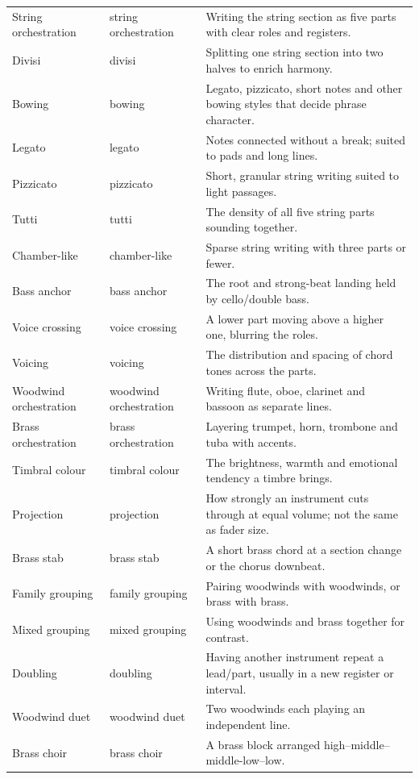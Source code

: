 \begin{longtable}{p{}p{}p{}}
String orchestration & string orchestration & Writing the string section as five parts with clear roles and registers. \\
Divisi & divisi & Splitting one string section into two halves to enrich harmony. \\
Bowing & bowing & Legato, pizzicato, short notes and other bowing styles that decide phrase character. \\
Legato & legato & Notes connected without a break; suited to pads and long lines. \\
Pizzicato & pizzicato & Short, granular string writing suited to light passages. \\
Tutti & tutti & The density of all five string parts sounding together. \\
Chamber-like & chamber-like & Sparse string writing with three parts or fewer. \\
Bass anchor & bass anchor & The root and strong-beat landing held by cello/double bass. \\
Voice crossing & voice crossing & A lower part moving above a higher one, blurring the roles. \\
Voicing & voicing & The distribution and spacing of chord tones across the parts. \\
Woodwind orchestration & woodwind orchestration & Writing flute, oboe, clarinet and bassoon as separate lines. \\
Brass orchestration & brass orchestration & Layering trumpet, horn, trombone and tuba with accents. \\
Timbral colour & timbral colour & The brightness, warmth and emotional tendency a timbre brings. \\
Projection & projection & How strongly an instrument cuts through at equal volume; not the same as fader size. \\
Brass stab & brass stab & A short brass chord at a section change or the chorus downbeat. \\
Family grouping & family grouping & Pairing woodwinds with woodwinds, or brass with brass. \\
Mixed grouping & mixed grouping & Using woodwinds and brass together for contrast. \\
Doubling & doubling & Having another instrument repeat a lead/part, usually in a new register or interval. \\
Woodwind duet & woodwind duet & Two woodwinds each playing an independent line. \\
Brass choir & brass choir & A brass block arranged high--middle--middle-low--low. \\

\end{longtable}
